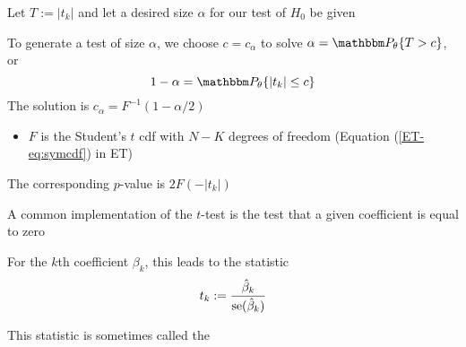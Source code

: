 \begin{frame}

    \vspace{2em}
    Let $T := |t_k|$ and let a desired size $\alpha$ for our test of $H_0$ be
    given
    
    \vspace{.7em}
    To generate a
    test of size $\alpha$, we choose $c = c_{\alpha}$ to solve $\alpha =
    \PP_{\theta}\{T > c\}$, or
    \begin{equation*}
        1 - \alpha = \PP_{\theta}\{|t_k| \leq c\}
    \end{equation*}
    The solution is
    $c_{\alpha} = F^{-1}(1 - \alpha/2)$
    \begin{itemize}
        \item  $F$ is the Student's $t$ {\sc cdf}
    with $N-K$ degrees of freedom (Equation (\ref{ET-eq:symcdf}) in ET)
    \end{itemize}
    
    \vspace{.7em}
    The
    corresponding $p$-value is $2 F(- |t_k|)$

\end{frame}


\begin{frame}

    \vspace{2em}
    \Eg
    A common implementation of the $t$-test is the
    test that a given coefficient is equal to zero
    
    \vspace{.7em}
    For the $k$th coefficient
    $\beta_k$, this leads to the statistic
    \begin{equation*}
        t_k := \frac{\hat \beta_k}{\operatorname{se}(\hat \beta_k)}
    \end{equation*}
    
    This statistic is sometimes called the 
    
    
\end{frame}



